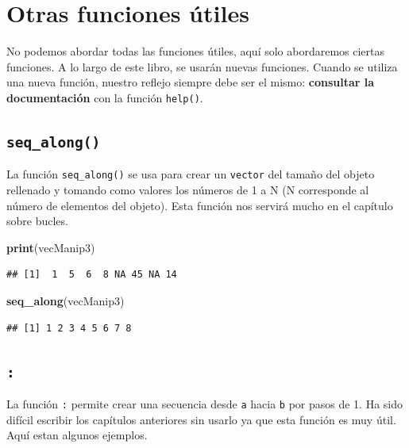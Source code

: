 \documentclass[
]{book}
\newenvironment{Shaded}{\begin{snugshade}}{\end{snugshade}}
\newcommand{\KeywordTok}[1]{\textcolor[rgb]{0.13,0.29,0.53}{\textbf{#1}}}
\newcommand{\NormalTok}[1]{#1}
\begin{document}
\hypertarget{otras-funciones-uxfatiles}{%
\section{Otras funciones útiles}\label{otras-funciones-uxfatiles}}

No podemos abordar todas las funciones útiles, aquí solo abordaremos ciertas funciones. A lo largo de este libro, se usarán nuevas funciones. Cuando se utiliza una nueva función, nuestro reflejo siempre debe ser el mismo: \textbf{consultar la documentación} con la función \texttt{help()}.

\hypertarget{l015seqalong}{%
\subsection{\texorpdfstring{\texttt{seq\_along()}}{seq\_along()}}\label{l015seqalong}}

La función \texttt{seq\_along()} se usa para crear un \texttt{vector} del tamaño del objeto rellenado y tomando como valores los números de 1 a N (N corresponde al número de elementos del objeto). Esta función nos servirá mucho en el capítulo sobre bucles.

\begin{Shaded}
\begin{Highlighting}[]
\KeywordTok{print}\NormalTok{(vecManip3)}
\end{Highlighting}
\end{Shaded}

\begin{verbatim}
## [1]  1  5  6  8 NA 45 NA 14
\end{verbatim}

\begin{Shaded}
\begin{Highlighting}[]
\KeywordTok{seq_along}\NormalTok{(vecManip3)}
\end{Highlighting}
\end{Shaded}

\begin{verbatim}
## [1] 1 2 3 4 5 6 7 8
\end{verbatim}

\hypertarget{l0152points}{%
\subsection{\texorpdfstring{\texttt{:}}{:}}\label{l0152points}}

La función \texttt{:} permite crear una secuencia desde \texttt{a} hacia \texttt{b} por pasos de 1. Ha sido difícil escribir los capítulos anteriores sin usarlo ya que esta función es muy útil. Aquí estan algunos ejemplos.
\end{document}
